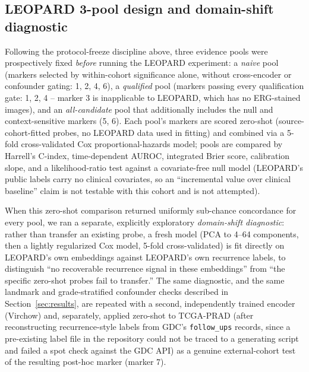 \subsection{LEOPARD 3-pool design and domain-shift diagnostic}
\label{sec:leopard-methods}

Following the protocol-freeze discipline above, three evidence pools were prospectively fixed \emph{before}
running the LEOPARD experiment: a \emph{naive} pool (markers selected by within-cohort
significance alone, without cross-encoder or confounder gating: 1, 2, 4, 6), a
\emph{qualified} pool (markers passing every qualification gate: 1, 2, 4 -- marker 3 is
inapplicable to LEOPARD, which has no ERG-stained images), and an \emph{all-candidate} pool
that additionally includes the null and context-sensitive markers (5, 6). Each pool's markers
are scored zero-shot (source-cohort-fitted probes, no LEOPARD data used in fitting) and
combined via a 5-fold cross-validated Cox proportional-hazards model; pools are compared by
Harrell's C-index, time-dependent AUROC, integrated Brier score, calibration slope, and a
likelihood-ratio test against a covariate-free null model (LEOPARD's public labels carry no
clinical covariates, so an ``incremental value over clinical baseline'' claim is not testable
with this cohort and is not attempted).

When this zero-shot comparison returned uniformly sub-chance concordance for every pool, we
ran a separate, explicitly exploratory \emph{domain-shift diagnostic}: rather than transfer an
existing probe, a fresh model (PCA to 4--64 components, then a lightly regularized Cox model,
5-fold cross-validated) is fit directly on LEOPARD's own embeddings against LEOPARD's own
recurrence labels, to distinguish ``no recoverable recurrence signal in these embeddings'' from
``the specific zero-shot probes fail to transfer.'' The same diagnostic, and the same landmark
and grade-stratified confounder checks described in Section~\ref{sec:results}, are repeated
with a second, independently trained encoder (Virchow) and, separately, applied zero-shot to
TCGA-PRAD (after reconstructing recurrence-style labels from GDC's \texttt{follow\_ups}
records, since a pre-existing label file in the repository could not be traced to a
generating script and failed a spot check against the GDC API) as a genuine external-cohort
test of the resulting post-hoc marker (marker 7).

